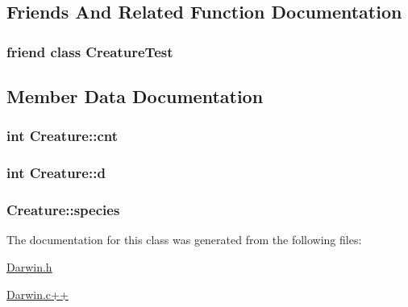 \subsection{Friends And Related Function Documentation}
\hypertarget{classCreature_a8c0a0bc2c49a9483eb70dbe9f74d0b9a}{
\subsubsection[{Creature\-Test}]{\setlength{\rightskip}{0pt plus 5cm}friend class Creature\-Test\hspace{0.3cm}{\ttfamily [friend]}}}\label{classCreature_a8c0a0bc2c49a9483eb70dbe9f74d0b9a}


\subsection{Member Data Documentation}
\hypertarget{classCreature_ab34d977d533d69e85bbda9b855977522}{
\subsubsection[{cnt}]{\setlength{\rightskip}{0pt plus 5cm}int Creature\-::cnt\hspace{0.3cm}{\ttfamily [private]}}}\label{classCreature_ab34d977d533d69e85bbda9b855977522}
\hypertarget{classCreature_ae087a10b645120093bb34f13e48c6bca}{
\subsubsection[{d}]{\setlength{\rightskip}{0pt plus 5cm}int Creature\-::d\hspace{0.3cm}{\ttfamily [private]}}}\label{classCreature_ae087a10b645120093bb34f13e48c6bca}
\hypertarget{classCreature_ab0b67d0fe5520b895a7b3a4af4e80506}{
\subsubsection[{species}]{ Creature\-::species\hspace{0.3cm}{\ttfamily [private]}}}\label{classCreature_ab0b67d0fe5520b895a7b3a4af4e80506}


The documentation for this class was generated from the following files\-:\begin{DoxyCompactItemize}
\item 
\hyperlink{Darwin_8h}{Darwin.\-h}\item 
\hyperlink{Darwin_8c_09_09}{Darwin.\-c++}\end{DoxyCompactItemize}
